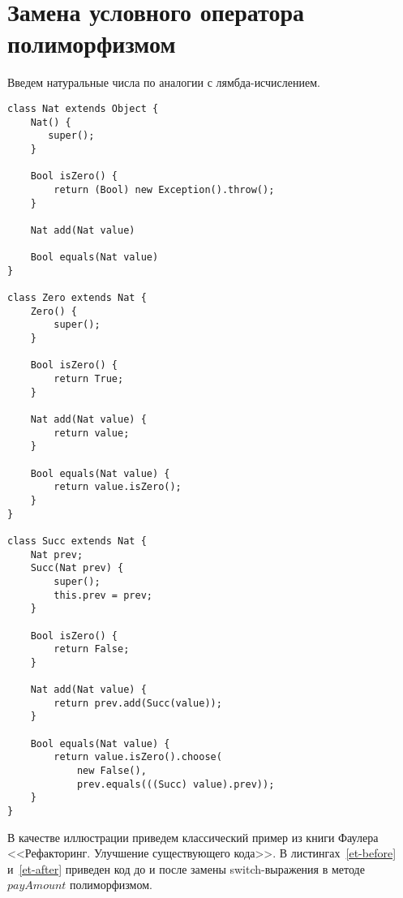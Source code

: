 \section{Замена условного оператора полиморфизмом}
Введем натуральные числа по аналогии с лямбда-исчислением.
\begin{lstlisting}[float=ht,label=nat,caption=Определение натуральных чисел]
class Nat extends Object {
    Nat() {
       super();
    }

    Bool isZero() {
        return (Bool) new Exception().throw();
    }

    Nat add(Nat value)

    Bool equals(Nat value)
}

class Zero extends Nat {
    Zero() {
        super();
    }

    Bool isZero() {
        return True;
    }

    Nat add(Nat value) {
        return value;
    }

    Bool equals(Nat value) {
        return value.isZero();
    }
}

class Succ extends Nat {
    Nat prev;
    Succ(Nat prev) {
        super();
        this.prev = prev;
    }

    Bool isZero() {
        return False;
    }

    Nat add(Nat value) {
        return prev.add(Succ(value));
    }

    Bool equals(Nat value) {
        return value.isZero().choose(
            new False(),
            prev.equals(((Succ) value).prev));
    }
}
\end{lstlisting}

В качестве иллюстрации приведем классический пример из книги Фаулера <<Рефакторинг. Улучшение существующего кода>>.
В листингах~\ref{et-before} и~\ref{et-after} приведен код до и после замены switch-выражения в методе $payAmount$ полиморфизмом.


